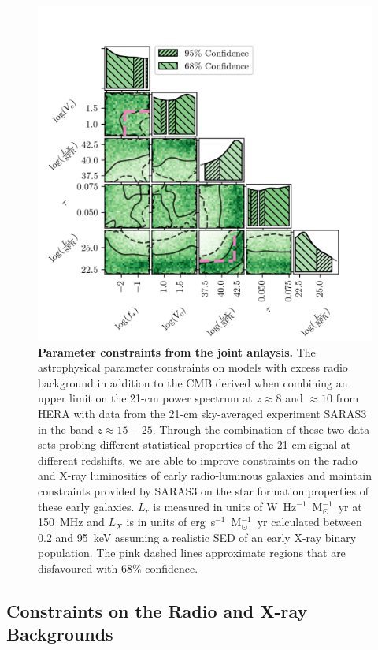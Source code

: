 \begin{figure}
    \centering
    \includegraphics{joint_constraints/figs/hera_saras3.png}
    \caption{\textbf{Parameter constraints from the joint anlaysis.} The astrophysical parameter constraints on models with excess radio background in addition to the CMB derived when combining an upper limit on the 21-cm power spectrum at $z\approx8$ and $\approx 10$ from HERA with data from the 21-cm sky-averaged experiment SARAS3 in the band $z\approx15-25$. Through the combination of these two data sets probing different statistical properties of the 21-cm signal at different redshifts, we are able to improve constraints on the radio and X-ray luminosities of early radio-luminous galaxies and maintain constraints provided by SARAS3 on the star formation properties of these early galaxies. $L_r$ is measured in units of W~Hz$^{-1}$~M$_\odot^{-1}$~yr at 150~MHz and $L_X$ is in units of erg~s$^{-1}$~M$_\odot^{-1}$~yr calculated between 0.2 and 95~keV assuming a realistic SED of an early X-ray binary population. The pink dashed lines approximate regions that are disfavoured with 68\% confidence.}
    \label{fig:posterior}
\end{figure}

\subsection{Constraints on the Radio and X-ray Backgrounds}

